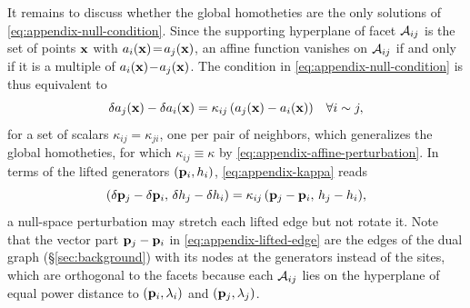 \documentclass[main.tex]{subfiles}
\begin{document}
It remains to discuss whether the global homotheties are the only solutions of \eqref{eq:appendix-null-condition}.
Since the supporting hyperplane of facet $\mathcal{A}_{ij}$ is the set of points $\mathbf{x}$ with $a_i(\mathbf{x}) \!=\! a_j(\mathbf{x})$, an affine function vanishes on $\mathcal{A}_{ij}$ if and only if it is a multiple of $a_i(\mathbf{x}) \!-\! a_j(\mathbf{x})$.
The condition in \eqref{eq:appendix-null-condition} is thus equivalent to
\begin{equation}
  \delta a_j(\mathbf{x}) - \delta a_i(\mathbf{x}) = \kappa_{ij}\,(a_j(\mathbf{x}) - a_i(\mathbf{x})) \quad \forall i \sim j ,
  \label{eq:appendix-kappa}
\end{equation}
for a set of scalars $\kappa_{ij} \!=\! \kappa_{ji}$, one per pair of neighbors, which generalizes the global homotheties, for which $\kappa_{ij} \!\equiv\! \kappa$ by \eqref{eq:appendix-affine-perturbation}.
In terms of the lifted generators $(\mathbf{p}_i, h_i)$, \eqref{eq:appendix-kappa} reads
\begin{equation}
  (\delta\mathbf{p}_j - \delta\mathbf{p}_i,\, \delta h_j - \delta h_i) = \kappa_{ij}\,(\mathbf{p}_j - \mathbf{p}_i,\, h_j - h_i) ,
  \label{eq:appendix-lifted-edge}
\end{equation}
\ie a null-space perturbation may stretch each lifted edge but not rotate it.
Note that the vector part $\mathbf{p}_j - \mathbf{p}_i$ in \eqref{eq:appendix-lifted-edge} are the edges of the dual graph (\S\ref{sec:background}) with its nodes at the generators instead of the sites, which are orthogonal to the facets because each $\mathcal{A}_{ij}$ lies on the hyperplane of equal power distance to $(\mathbf{p}_i, \lambda_i)$ and $(\mathbf{p}_j, \lambda_j)$.
\end{document}
